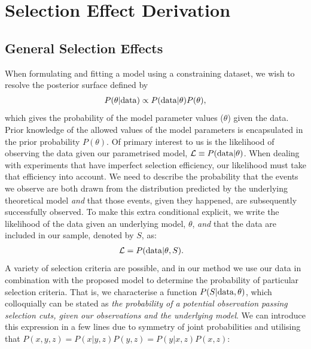 \documentclass[a4paper,fleqn,usenatbib]{emulateapj}
\begin{document}









\appendix

\section{Selection Effect Derivation}
\label{app:selection}

\subsection{General Selection Effects}
\label{app:selection1}
When formulating and fitting a model using a constraining dataset, we wish to resolve the posterior surface defined by
\begin{align}
P(\theta | {\rm data}) \propto P({\rm data} | \theta) P(\theta),
\end{align}
which gives the probability of the model parameter values ($\theta$) given the data.  Prior knowledge of the allowed values of the model parameters is encapsulated in the prior probability $P(\theta)$. Of primary interest to us is the likelihood of observing the data given our parametrised model, $\mathcal{L} \equiv P({\rm data} | \theta)$. When dealing with experiments that have imperfect selection efficiency, our likelihood must take that efficiency into account.  We need to describe the probability that the events we observe are both drawn from the distribution predicted by the underlying theoretical model \textit{and} that those events, given they happened, are subsequently successfully observed.  To make this extra conditional explicit, we write the likelihood of the data given an underlying model, $\theta$, \textit{and} that the data are included in our sample, denoted by $S$, as:
\begin{align}
\mathcal{L} &= P({\rm data} | \theta, S). \label{eq:app_like}
\end{align}
A variety of selection criteria are possible, and in our method we use our data in combination with the proposed model to determine the probability of particular selection criteria.  That is, we characterise a function $P(S|{\rm data},\theta)$, which colloquially can be stated as \textit{the probability of a potential observation passing selection cuts, given our observations and the underlying model}. We can introduce this expression in a few lines due to symmetry of joint probabilities and utilising that $P(x,y,z) = P(x|y,z)P(y,z) = P(y|x, z)P(x, z)$:
\end{document}
